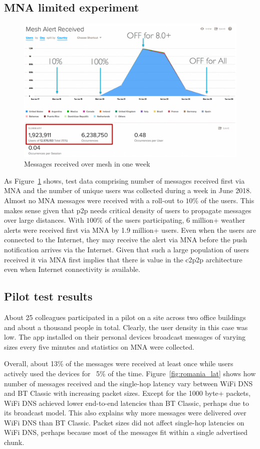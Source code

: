 \documentclass[conference]{IEEEtran}
\begin{document}
\subsection{MNA limited experiment}
\label{sec:mna}
%
\begin{figure}[htbp]
\centerline{\includegraphics[width=\columnwidth]{figs/mna}}
\caption{Messages received over mesh in one week}
\label{fig:mna}
\end{figure}
%
As Figure~\ref{fig:mna} shows, test data comprising number of messages
received first via MNA and the number of unique users was collected
during a week in June 2018. Almost no MNA messages were received with
a roll-out to $10\%$ of the users.  This makes sense given that p2p
needs critical density of users to propagate messages over large
distances.  With $100\%$ of the users participating, 6 million+
weather alerts were received first via MNA by 1.9 million+ users. Even
when the users are connected to the Internet, they may receive the
alert via MNA before the push notification arrives via the
Internet. Given that such a large population of users received it via
MNA first implies that there is value in the c2p2p architecture even
when Internet connectivity is available.
%
\subsection{Pilot test results}
\label{sec:romania}
%
About 25 colleagues participated in a pilot on a site across two
office buildings and about a thousand people in total.  Clearly, the
user density in this case was low. The app installed on their personal
devices broadcast messages of varying sizes every five minutes
and statistics on MNA were collected. 

Overall, about 13\% of the messages were received at least once while
users actively used the devices for ~5\% of the time.
Figure~\ref{fig:romania_lat} shows how number of messages received and
the single-hop latency vary between WiFi DNS and BT Classic with
increasing packet sizes. Except for the 1000 byte+ packets, WiFi DNS
achieved lower end-to-end latencies than BT Classic, perhaps due to
its broadcast model. This also explains why more messages were
delivered over WiFi DNS than BT Classic. Packet sizes did not affect
single-hop latencies on WiFi DNS, perhaps because most of the messages
fit within a single advertised chunk.
\end{document}
